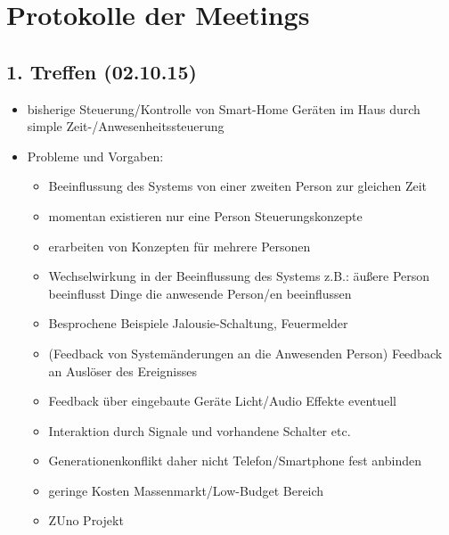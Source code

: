 
\chapter{Protokolle der Meetings}
\label{[chap:protokolle]}

\section{1. Treffen (02.10.15)}
\begin{itemize}
	\item bisherige Steuerung/Kontrolle von Smart-Home Geräten im Haus durch simple Zeit-/Anwesenheitssteuerung
	\item Probleme und Vorgaben:
	\begin{itemize}
		\item Beeinflussung des Systems von einer zweiten Person zur gleichen Zeit
		\item momentan existieren nur eine Person Steuerungskonzepte
		\item erarbeiten von Konzepten für mehrere Personen
		\item Wechselwirkung in der Beeinflussung des Systems z.B.: äußere Person beeinflusst Dinge die anwesende Person/en beeinflussen
		\item Besprochene Beispiele Jalousie-Schaltung, Feuermelder
		\item (Feedback von Systemänderungen an die Anwesenden Person) Feedback an Auslöser des Ereignisses
		\item Feedback über eingebaute Geräte Licht/Audio Effekte eventuell
		\item Interaktion durch Signale und vorhandene Schalter etc.
		\item Generationenkonflikt daher nicht Telefon/Smartphone fest anbinden
		\item geringe Kosten Massenmarkt/Low-Budget Bereich
		\item ZUno Projekt
	\end{itemize}
	

\end{itemize}
